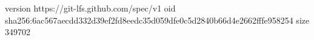 version https://git-lfs.github.com/spec/v1
oid sha256:6ac567aecdd332d39ef2fd8eedc35d059dfe0c5d2840b66d4e2662fffe958254
size 349702
